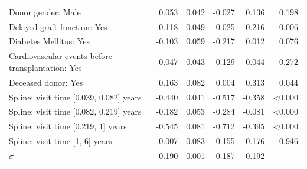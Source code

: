 \begin{table}[!htb]
\begin{center}
\begin{tabular}{lrrrrr}
Donor gender: Male                                                                      & 0.053  & 0.042    & -0.027 & 0.136  & 0.198          \\
Delayed graft function: Yes                                                                       & 0.118  & 0.049    & 0.025  & 0.216  & 0.006          \\
Diabetes Mellitus: Yes                                                                        & -0.103 & 0.059    & -0.217 & 0.012  & 0.076          \\
Cardiovascular events before transplantation: Yes                                                                     & -0.047 & 0.043    & -0.129 & 0.044  & 0.272          \\
Deceased donor: Yes                                                                 & 0.163  & 0.082    & 0.004  & 0.313  & 0.044          \\
Spline: visit time [0.039, 0.082] years & -0.440 & 0.041    & -0.517 & -0.358 & \textless0.000 \\
Spline: visit time [0.082, 0.219] years & -0.182 & 0.053    & -0.284 & -0.081 & \textless0.000 \\
Spline: visit time [0.219, 1] years & -0.545 & 0.081    & -0.712 & -0.395 & \textless0.000 \\
Spline: visit time [1, 6] years & 0.007  & 0.083    & -0.155 & 0.176  & 0.946          \\
$\sigma$                                                                            & 0.190  & 0.001    & 0.187  & 0.192  & \\
\hline
\end{tabular}
\end{center}
\end{table}

